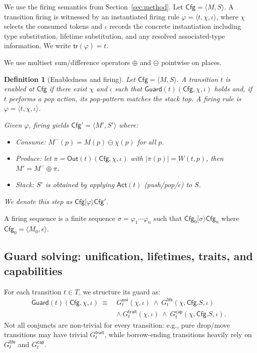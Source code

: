 \documentclass[sigconf]{acmart}
\newtheorem{definition}{Definition}
\begin{document}
We use the firing semantics from Section~\ref{sec:method}.
Let $\mathsf{Cfg}=\langle M,S\rangle$. A transition firing is witnessed by an instantiated firing rule $\varphi=\langle t,\chi,\iota\rangle$, where $\chi$ selects the consumed tokens and $\iota$ records the concrete instantiation including type substitution, lifetime substitution, and any resolved associated-type information. We write $\mathsf{tr}(\varphi)=t$.

We use multiset sum/difference operators $\oplus$ and $\ominus$ pointwise on places.

\begin{definition}[Enabledness and firing]
\label{def:pcpn:firing}
Let $\mathsf{Cfg}=\langle M,S\rangle$.
A transition $t$ is enabled at $\mathsf{Cfg}$ if there exist
$\chi$ and $\iota$ such that $\mathsf{Guard}(t)(\mathsf{Cfg},\chi,\iota)$ holds and, if $t$ performs a pop action,
its pop-pattern matches the stack top.
A firing rule is $\varphi=\langle t,\chi,\iota\rangle$.

Given $\varphi$, firing yields $\mathsf{Cfg}'=\langle M',S'\rangle$ where:
\begin{itemize}
\item Consume: $M^{-}(p)=M(p)\ominus \chi(p)$ for all $p$.
\item Produce: let $\pi=\mathsf{Out}(t)(\mathsf{Cfg},\chi,\iota)$ with $|\pi(p)|=W(t,p)$, then $M'=M^{-}\oplus \pi$.
\item Stack: $S'$ is obtained by applying $\mathsf{Act}(t)$ (push/pop/$\epsilon$) to $S$.
\end{itemize}
We denote this step as $\mathsf{Cfg}[\varphi\rangle \mathsf{Cfg}'$.
\end{definition}

A firing sequence is a finite sequence $\sigma=\varphi_1\cdots\varphi_n$ such that
$\mathsf{Cfg}_0[\sigma\rangle \mathsf{Cfg}_n$ where $\mathsf{Cfg}_0=\langle M_0,\epsilon\rangle$.

\subsection{Guard solving: unification, lifetimes, traits, and capabilities}
\label{sec:analysis:guard}

For each transition $t\in T$, we structure its guard as:
\begin{align*}
\mathsf{Guard}(t)(\mathsf{Cfg},\chi,\iota)\ \equiv\
&G_t^{\mathsf{uni}}(\chi,\iota)\ \wedge\
G_t^{\mathsf{life}}(\chi,\mathsf{Cfg}.S,\iota) \\
&\wedge\
G_t^{\mathsf{trait}}(\chi,\iota)\ \wedge\
G_t^{\mathsf{cap}}(\chi,\mathsf{Cfg}.S,\iota).
\end{align*}
Not all conjuncts are non-trivial for every transition:
e.g., pure drop/move transitions may have trivial $G_t^{\mathsf{trait}}$,
while borrow-ending transitions heavily rely on $G_t^{\mathsf{life}}$ and $G_t^{\mathsf{cap}}$.
\end{document}

